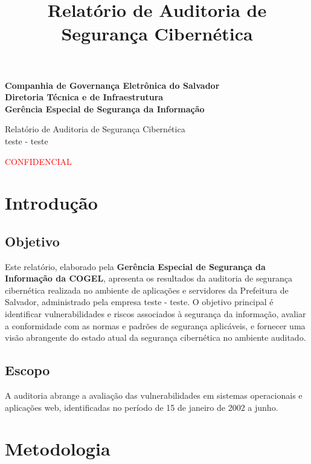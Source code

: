 \documentclass[a4paper,12pt]{article}
\title{Relatório de Auditoria de Segurança Cibernética}
\author{}
\date{}
\begin{document}
\begin{center}
    \large{\textbf{Companhia de Governança Eletrônica do Salvador\\
Diretoria Técnica e de Infraestrutura\\
Gerência Especial de Segurança da Informação\\
}}

\vspace{7cm}

\Large{Relatório de Auditoria de Segurança Cibernética\\
teste - teste}

\vspace{4cm}
\textcolor{red}{CONFIDENCIAL}
\end{center}
\newpage

\tableofcontents  %


\newpage

\section{Introdução}
\subsection{Objetivo}
Este relatório, elaborado pela \textbf{Gerência Especial de Segurança da Informação da COGEL}, apresenta os resultados da auditoria de segurança cibernética realizada no ambiente de aplicações e servidores da Prefeitura de Salvador, administrado pela empresa teste - teste. O objetivo principal é identificar vulnerabilidades e riscos associados à segurança da informação, avaliar a conformidade com as normas e padrões de segurança aplicáveis, e fornecer uma visão abrangente do estado atual da segurança cibernética no ambiente auditado.

\subsection{Escopo}
A auditoria abrange a avaliação das vulnerabilidades em sistemas operacionais e aplicações web, identificadas no período de 15 de janeiro de 2002 a junho.

\section{Metodologia}
\end{document}
